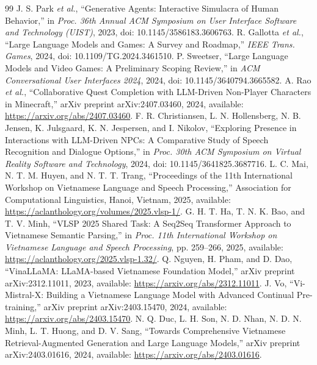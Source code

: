 ﻿\documentclass[a4paper,12pt]{article}
\begin{document}
\begingroup
\sloppy
\begin{thebibliography}{99}
 J. S. Park \emph{et al.}, ``Generative Agents: Interactive Simulacra of Human Behavior,'' in \emph{Proc. 36th Annual ACM Symposium on User Interface Software and Technology (UIST)}, 2023, doi: 10.1145/3586183.3606763.
 R. Gallotta \emph{et al.}, ``Large Language Models and Games: A Survey and Roadmap,'' \emph{IEEE Trans. Games}, 2024, doi: 10.1109/TG.2024.3461510.
 P. Sweetser, ``Large Language Models and Video Games: A Preliminary Scoping Review,'' in \emph{ACM Conversational User Interfaces 2024}, 2024, doi: 10.1145/3640794.3665582.
 A. Rao \emph{et al.}, ``Collaborative Quest Completion with LLM-Driven Non-Player Characters in Minecraft,'' arXiv preprint arXiv:2407.03460, 2024, available: \url{https://arxiv.org/abs/2407.03460}.
 F. R. Christiansen, L. N. Hollensberg, N. B. Jensen, K. Julsgaard, K. N. Jespersen, and I. Nikolov, ``Exploring Presence in Interactions with LLM-Driven NPCs: A Comparative Study of Speech Recognition and Dialogue Options,'' in \emph{Proc. 30th ACM Symposium on Virtual Reality Software and Technology}, 2024, doi: 10.1145/3641825.3687716.
 L. C. Mai, N. T. M. Huyen, and N. T. T. Trang, ``Proceedings of the 11th International Workshop on Vietnamese Language and Speech Processing,'' Association for Computational Linguistics, Hanoi, Vietnam, 2025, available: \url{https://aclanthology.org/volumes/2025.vlsp-1/}.
 G. H. T. Ha, T. N. K. Bao, and T. V. Minh, ``VLSP 2025 Shared Task: A Seq2Seq Transformer Approach to Vietnamese Semantic Parsing,'' in \emph{Proc. 11th International Workshop on Vietnamese Language and Speech Processing}, pp. 259--266, 2025, available: \url{https://aclanthology.org/2025.vlsp-1.32/}.
 Q. Nguyen, H. Pham, and D. Dao, ``VinaLLaMA: LLaMA-based Vietnamese Foundation Model,'' arXiv preprint arXiv:2312.11011, 2023, available: \url{https://arxiv.org/abs/2312.11011}.
 J. Vo, ``Vi-Mistral-X: Building a Vietnamese Language Model with Advanced Continual Pre-training,'' arXiv preprint arXiv:2403.15470, 2024, available: \url{https://arxiv.org/abs/2403.15470}.
 N. Q. Duc, L. H. Son, N. D. Nhan, N. D. N. Minh, L. T. Huong, and D. V. Sang, ``Towards Comprehensive Vietnamese Retrieval-Augmented Generation and Large Language Models,'' arXiv preprint arXiv:2403.01616, 2024, available: \url{https://arxiv.org/abs/2403.01616}.

\end{thebibliography}
\end{document}
